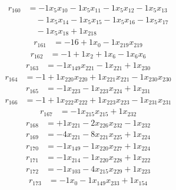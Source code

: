 \[\begin{aligned}
r_{160} &= - 1 x_{5} x_{10} - 1 x_{5} x_{11} - 1 x_{5} x_{12} - 1 x_{5} x_{13} \\
 &\quad - 1 x_{5} x_{14} - 1 x_{5} x_{15} - 1 x_{5} x_{16} - 1 x_{5} x_{17} \\
 &\quad - 1 x_{5} x_{18} + 1 x_{218}
\end{aligned}\]
\[\begin{aligned}
r_{161} &= - 16 + 1 x_{0} - 1 x_{219} x_{219}
\end{aligned}\]
\[\begin{aligned}
r_{162} &= - 1 + 1 x_{2} + 1 x_{6} - 1 x_{6} x_{6}
\end{aligned}\]
\[\begin{aligned}
r_{163} &= - 1 x_{149} x_{221} - 1 x_{221} + 1 x_{230}
\end{aligned}\]
\[\begin{aligned}
r_{164} &= - 1 + 1 x_{220} x_{220} + 1 x_{221} x_{221} - 1 x_{230} x_{230}
\end{aligned}\]
\[\begin{aligned}
r_{165} &= - 1 x_{223} - 1 x_{223} x_{224} + 1 x_{231}
\end{aligned}\]
\[\begin{aligned}
r_{166} &= - 1 + 1 x_{222} x_{222} + 1 x_{223} x_{223} - 1 x_{231} x_{231}
\end{aligned}\]
\[\begin{aligned}
r_{167} &= - 1 x_{215} x_{215} + 1 x_{232}
\end{aligned}\]
\[\begin{aligned}
r_{168} &= + 1 x_{221} - 2 x_{226} x_{232} - 1 x_{232}
\end{aligned}\]
\[\begin{aligned}
r_{169} &= - 4 x_{221} - 8 x_{221} x_{225} + 1 x_{224}
\end{aligned}\]
\[\begin{aligned}
r_{170} &= - 1 x_{149} - 1 x_{220} x_{227} + 1 x_{224}
\end{aligned}\]
\[\begin{aligned}
r_{171} &= - 1 x_{214} - 1 x_{220} x_{228} + 1 x_{222}
\end{aligned}\]
\[\begin{aligned}
r_{172} &= - 1 x_{103} - 4 x_{215} x_{229} + 1 x_{223}
\end{aligned}\]
\[\begin{aligned}
r_{173} &= - 1 x_{0} - 1 x_{149} x_{233} + 1 x_{154}
\end{aligned}\]
